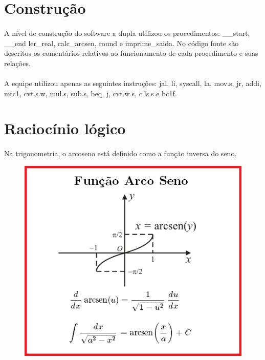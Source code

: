 \documentclass[a4paper, 12pt]{article}
\begin{document}
\section{Constru\c{c}\~ao}
\paragraph{}	A n\'ivel de constru\c{c}\~ao do software a dupla utilizou os procedimentos: \_\_start, \_\_end ler\_real, calc\_arcsen, round e imprime\_saida. No c\'odigo fonte s\~ao descritos os coment\'arios relativos ao funcionamento de cada procedimento e suas rela\c{c}\~oes.
\paragraph{}	A equipe utilizou apenas as seguintes instru\c{c}\~oes: jal, li, syscall, la, mov.s, jr, addi, mtc1, cvt.s.w, mul.s, sub.s, beq, j, cvt.w.s, c.ls.s e bc1f.

\section{Racioc\'inio l\'ogico} 
	\paragraph{}	Na trigonometria, o arcoseno est\'a definido como a funç\~ao inversa do seno.
	\begin{figure}[H]
		\centering
		\includegraphics[scale=0.5]{img9.png}
	\end{figure}
\end{document}
